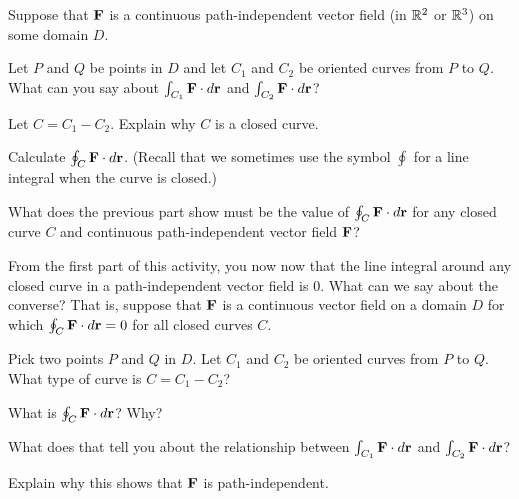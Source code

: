 \begin{activity} \label{A:12.4.3}  
Suppose that $\mathbf{F}$ is a continuous path-independent vector field (in
$\mathbb{R}^2$ or $\mathbb{R}^3$) on some domain $D$. 
\ba
\item Let $P$ and $Q$ be points in $D$ and let $C_1$ and $C_2$ be
  oriented curves from $P$ to $Q$. What can you say about
  $\int_{C_1}\mathbf{F}\cdot d\mathbf{r}$ and   $\int_{C_2}\mathbf{F}\cdot d\mathbf{r}$?
\item Let $C = C_1 - C_2$. Explain why $C$ is a closed curve.
\item Calculate $\oint_C\mathbf{F}\cdot d\mathbf{r}$. (Recall that we sometimes use
  the symbol $\oint$ for a line integral when the curve is closed.)
\item What does the previous part show must be the value of   $\oint_C
  \mathbf{F}\cdot d\mathbf{r}$ for any closed curve $C$ 
and continuous path-independent vector field $\mathbf{F}$?
\saveCount
\ea

From the first part of this activity, you now now that the line
integral around any closed curve in a path-independent vector field is
$0$. What can we say about the converse? That is, suppose that $\mathbf{F}$
is a continuous vector field on a domain $D$ for which
$\oint_C\mathbf{F}\cdot d\mathbf{r} = 0$ for all closed curves $C$.
\ba
\restoreCount
\item Pick two points $P$ and $Q$ in $D$. Let $C_1$ and $C_2$ be
  oriented curves from $P$ to $Q$. What type of curve is $C = C_1 -
  C_2$?
\item What is $\oint_C\mathbf{F}\cdot d\mathbf{r}$? Why?
\item What does that tell you about the relationship between
  $\int_{C_1}\mathbf{F}\cdot d\mathbf{r}$ and $\int_{C_2}\mathbf{F}\cdot d\mathbf{r}$?
\item Explain why this shows that $\mathbf{F}$ is path-independent.
\ea
\end{activity}
\begin{smallhint}

\end{smallhint}
\begin{bighint}

\end{bighint}
\begin{activitySolution}

\end{activitySolution}
\aftera
